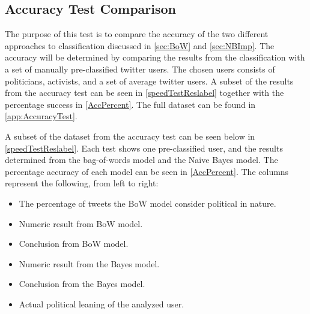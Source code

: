 \subsection{Accuracy Test Comparison}
The purpose of this test is to compare the accuracy of the two different
approaches to classification discussed in \autoref{sec:BoW} and
\autoref{sec:NBImp}. The accuracy will be determined by comparing the results
from the classification with a set of manually pre-classified twitter users.
The chosen users consists of politicians, activists, and a set of average
twitter users. A subset of the results from the accuracy test can be seen in
\autoref{speedTestReslabel} together with the percentage success in
\autoref{AccPercent}. The full dataset can be found in
\autoref{app:AccuracyTest}.\nl

A subset of the dataset from the accuracy test can be seen below in
\autoref{speedTestReslabel}. Each test shows one pre-classified user, and the
results determined from the bag-of-words model and the Naive Bayes model. The percentage accuracy
of each model can be seen in \autoref{AccPercent}.
The columns represent the following, from left to right:\nl

\begin{itemize}
  \item The percentage of tweets the BoW model
consider political in nature.
\item Numeric result from BoW model.
\item Conclusion from BoW model.
\item Numeric result from the Bayes model.
\item Conclusion from the Bayes model.
\item Actual political leaning of the analyzed user.
\end{itemize}

